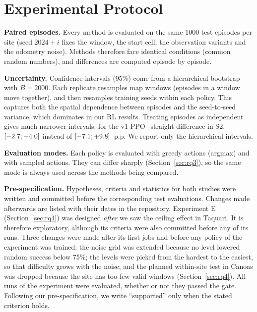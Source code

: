\section{Experimental Protocol}
\label{sec:protocol}

\textbf{Paired episodes.}
Every method is evaluated on the same 1000 test episodes per site (seed $2024+i$ fixes the window, the start cell, the observation variants and the odometry noise). Methods therefore face identical conditions (common random numbers), and differences are computed episode by episode.

\textbf{Uncertainty.}
Confidence intervals (95\%) come from a hierarchical bootstrap with $B=2000$. Each replicate resamples map windows (episodes in a window move together), and then resamples training seeds within each policy. This captures both the spatial dependence between episodes and the seed-to-seed variance, which dominates in our RL results. Treating episodes as independent gives much narrower intervals: for the v1 PPO$-$straight difference in S2, $[-2.7; +4.0]$ instead of $[-7.1; +9.8]$~p.p. We report only the hierarchical intervals.

\textbf{Evaluation modes.}
Each policy is evaluated with greedy actions (argmax) and with sampled actions. They can differ sharply (Section~\ref{sec:rq3}), so the same mode is always used across the methods being compared.

\textbf{Pre-specification.}
Hypotheses, criteria and statistics for both studies were written and committed before the corresponding test evaluations. Changes made afterwards are listed with their dates in the repository. Experiment E (Section~\ref{sec:rq4}) was designed \emph{after} we saw the ceiling effect in Taquari. It is therefore exploratory, although its criteria were also committed before any of its runs. Three changes were made after its first jobs and before any policy of the experiment was trained: the noise grid was extended because no level lowered random success below 75\%; the levels were picked from the hardest to the easiest, so that difficulty grows with the noise; and the planned within-site test in Canoas was dropped because the site has too few valid windows (Section~\ref{sec:rq4}). All runs of the experiment were evaluated, whether or not they passed the gate. Following our pre-specification, we write ``supported'' only when the stated criterion holds.

